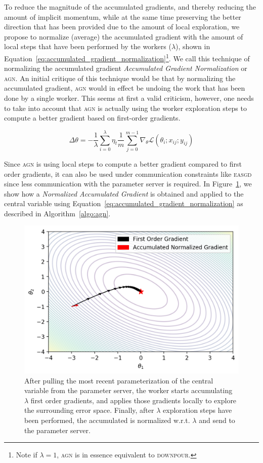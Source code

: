 To reduce the magnitude of the accumulated gradients, and thereby reducing the amount of implicit momentum, while at the same time preserving the better direction that has been provided due to the amount of local exploration, we propose to normalize (average) the accumulated gradient with the amount of local steps that have been performed by the workers ($\lambda$), shown in Equation~\ref{eq:accumulated_gradient_normalization}\footnote{Note if $\lambda = 1$, \textsc{agn} is in essence equivalent to \textsc{downpour}.}. We call this technique of normalizing the accumulated gradient \emph{Accumulated Gradient Normalization} or \textsc{agn}. An initial critique of this technique would be that by normalizing the accumulated gradient, \textsc{agn} would in effect be undoing the work that has been done by a single worker. This seems at first a valid criticism, however, one needs to take into account that \textsc{agn} is actually using the worker exploration steps to compute a better gradient based on first-order gradients.

\begin{equation}
  \label{eq:accumulated_gradient_normalization}
  \Delta\theta = -\frac{1}{\lambda}\sum_{i = 0}^\lambda \eta_t \frac{1}{m}\sum_{j = 0}^{m - 1} \nabla_\theta \mathcal{L}(\theta_i;x_{ij};y_{ij})
\end{equation}

Since \textsc{agn} is using local steps to compute a better gradient compared to first order gradients, it can also be used under communication constraints like \textsc{easgd} since less communication with the parameter server is required. In Figure~\ref{fig:agn_example}, we show how a \emph{Normalized Accumulated Gradient} is obtained and applied to the central variable using Equation~\ref{eq:accumulated_gradient_normalization} as described in Algorithm~\ref{algo:agn}.

\begin{figure}[H]
  \centering
  \includegraphics[width=.45\textwidth]{resources/images/agn_example}
  \caption{After pulling the most recent parameterization of the central variable from the parameter server, the worker starts accumulating $\lambda$ first order gradients, and applies those gradients locally to explore the surrounding error space. Finally, after $\lambda$ exploration steps have been performed, the accumulated is normalized w.r.t. $\lambda$ and send to the parameter server.}
  \label{fig:agn_example}
\end{figure}

